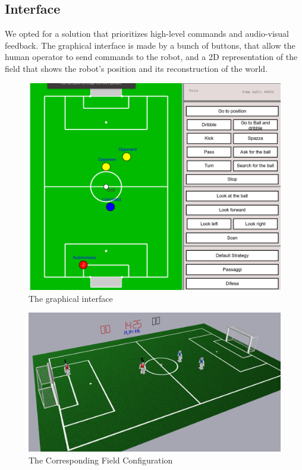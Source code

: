 \documentclass[a4paper, onecolumn, 12pt]{article}
\begin{document}
\subsection{Interface}

We opted for a solution that prioritizes high-level commands and audio-visual
feedback. The graphical interface is made by a bunch of buttons, that allow the
human operator to send commands to the robot, and a 2D representation of the
field that shows the robot's position and its reconstruction of the world.  

\begin{figure}[H]
    \centering
    \includegraphics[width=0.9\linewidth]{assets/interface.png}
    \caption{The graphical interface}
    \label{fig:interface}
\end{figure}

\begin{figure}[H]
    \centering
    \includegraphics[width=0.9\linewidth]{assets/simrobot.png}
    \caption{The Corresponding Field Configuration}
    \label{fig:nao}
\end{figure}
\end{document}
